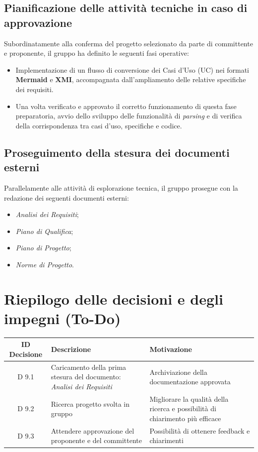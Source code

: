 \documentclass[a4paper, 11pt]{article}
\begin{document}
\subsection{Pianificazione delle attività tecniche in caso di approvazione}
Subordinatamente alla conferma del progetto selezionato da parte di committente e proponente, il gruppo ha definito le seguenti fasi operative:
\begin{itemize}
    \item Implementazione di un flusso di conversione dei Casi d'Uso (UC) nei formati \textbf{Mermaid} e \textbf{XMI}, accompagnata dall'ampliamento delle relative specifiche dei requisiti.\vspace{-0.2cm}
    \item Una volta verificato e approvato il corretto funzionamento di questa fase preparatoria, avvio dello sviluppo delle funzionalità di \textit{parsing} e di verifica della corrispondenza tra casi d'uso, specifiche e codice.
\end{itemize}

\subsection{Proseguimento della stesura dei documenti esterni}
Parallelamente alle attività di esplorazione tecnica, il gruppo prosegue con la redazione dei seguenti documenti esterni:
\begin{itemize}
    \item \textit{Analisi dei Requisiti};\vspace{-0.2cm}
    \item \textit{Piano di Qualifica};\vspace{-0.2cm}
    \item \textit{Piano di Progetto};\vspace{-0.2cm}
    \item \textit{Norme di Progetto}.
\end{itemize}
\newpage


\section{Riepilogo delle decisioni e degli impegni (To-Do)}

\begin{tabularx}{\textwidth}{|c|X|X|}
    \hline
    \textbf{ID Decisione} & \textbf{Descrizione} & \textbf{Motivazione} \\ \hline
    D 9.1 & Caricamento della prima stesura del documento: \textit{Analisi dei Requisiti} & Archiviazione della documentazione approvata \\ \hline
    D 9.2 & Ricerca progetto svolta in gruppo & Migliorare la qualità della ricerca e possibilità di chiarimento più efficace \\ \hline
    D 9.3 & Attendere approvazione del proponente e del committente & Possibilità di ottenere feedback e chiarimenti\\ \hline
\end{tabularx}
\end{document}
